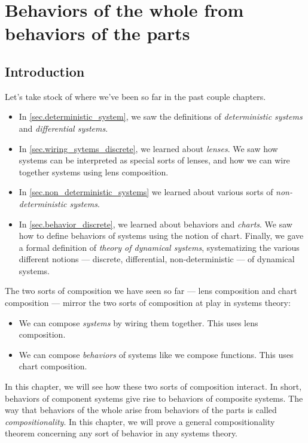 \documentclass[DynamicalBook]{subfiles}
\begin{document}
%


\setcounter{chapter}{4}%


\chapter{Behaviors of the whole from behaviors of the parts}\label{chapter.5}

\section{Introduction}

Let's take stock of where we've been so far in the past couple chapters.
\begin{itemize}
  \item In \cref{sec.deterministic_system}, we saw the definitions of
    \emph{deterministic systems} and \emph{differential systems}.
  \item In \cref{sec.wiring_sytems_discrete}, we learned about \emph{lenses}. We saw how systems can be
    interpreted as special sorts of lenses, and how we can wire together systems
    using lens composition.
  \item In \cref{sec.non_deterministic_systems} we learned about various sorts
    of \emph{non-deterministic systems}.
  \item In \cref{sec.behavior_discrete}, we learned about behaviors and \emph{charts}. We saw
    how to define behaviors of systems using the notion of chart. Finally, we
    gave a formal definition of \emph{theory of dynamical systems}, systematizing
    the various different notions --- discrete, differential, non-deterministic
    --- of dynamical systems. 
\end{itemize}

The two sorts of composition we have seen so far --- lens composition and chart
composition --- mirror the two sorts of composition at play in systems theory:
\begin{itemize}
  \item We can compose \emph{systems} by wiring them together. This uses lens composition.
  \item We can compose \emph{behaviors} of systems like we compose functions.
    This uses chart composition.
\end{itemize}

In this chapter, we will see how these two sorts of composition interact. In
short, behaviors of component systems give rise to behaviors of composite
systems. The way that behaviors of the whole arise from behaviors of the parts
is called \emph{compositionality}. In this chapter, we will prove a general
compositionality theorem concerning any sort of behavior in any systems theory.
\end{document}
